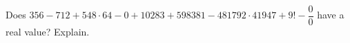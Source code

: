 Does $356-712+548\cdot 64-0+10283+598381-481792\cdot 41947+9!-\dfrac{0}{0}$ have a real value? Explain.
